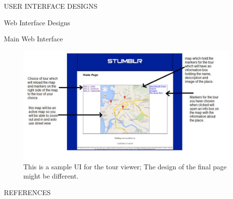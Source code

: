 \documentclass{article}
\begin{document}
\begin{section}{USER INTERFACE DESIGNS}
		\clearpage
		\begin{subsection}{Web Interface Designs}
			\begin{subsubsection}{Main Web Interface}
				\begin{figure}[h!]
					\begin{center}
						\includegraphics[height=0.55\columnwidth]{../Diagrams/WebUserInterface/AnnotatedUI.jpg}
					\end{center}
					\caption{This is a sample UI for the tour viewer;  The design of the final page might be different.}
				\end{figure}
			\end{subsubsection}
		\end{subsection}
	\end{section}

	\nocite{LaTeXTemplate}

	\newpage
	\begin{section}{REFERENCES}
		
		
	\end{section}
\end{document}

